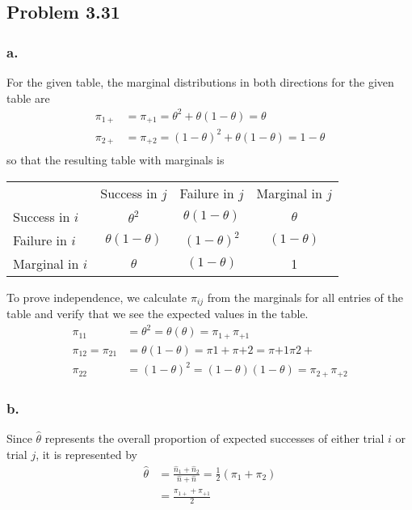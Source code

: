 \documentclass{article}
\begin{document}
\subsection{Problem 3.31}
\subsubsection{a.}
For the given table, the marginal distributions in both directions for the given table are 
\begin{align*}
\pi_{1+} &= \pi_{+1} = \theta^2 + \theta(1-\theta) = \theta \\
\pi_{2+} &= \pi_{+2} = (1-\theta)^2 + \theta(1-\theta) = 1-\theta \\
\end{align*}
so that the resulting table with marginals is 
\begin{center}
\begin{tabular}{lccc}
&Success in $j$&Failure in $j$&Marginal in $j$\\
Success in $i$&$\theta^2$&$\theta(1-\theta)$&$\theta$ \\ 
Failure in $i$&$\theta(1-\theta)$&$(1-\theta)^2$&$(1-\theta)$ \\ 
Marginal in $i$&$\theta$&$(1-\theta)$&1 \\
\end{tabular}
\end{center}
To prove independence, we calculate $\pi_{ij}$ from the marginals for all entries of the table and verify that we see the expected values in the table.
\begin{align*}
\pi_{11} &= \theta^2 = \theta(\theta) = \pi_{1+}\pi_{+1} \\
\pi_{12} = \pi_{21} &= \theta(1-\theta) = \pi{1+}\pi{+2} = \pi{+1}\pi{2+} \\
\pi_{22} &= (1-\theta)^2 = (1-\theta)(1-\theta)= \pi_{2+}\pi_{+2}
\end{align*}
\subsubsection{b.}
Since $\hat\theta$ represents the overall proportion of expected successes of either trial $i$ or trial $j$, it is represented by 
\begin{align*}
\hat\theta &= \frac{\hat n_1 + \hat n_2}{\hat n + \hat n} = \frac{1}{2}\left(\pi_1 + \pi_2\right) \\
&= \frac{\pi_{1+}+\pi_{+1}}{2}
\end{align*}
\end{document}
